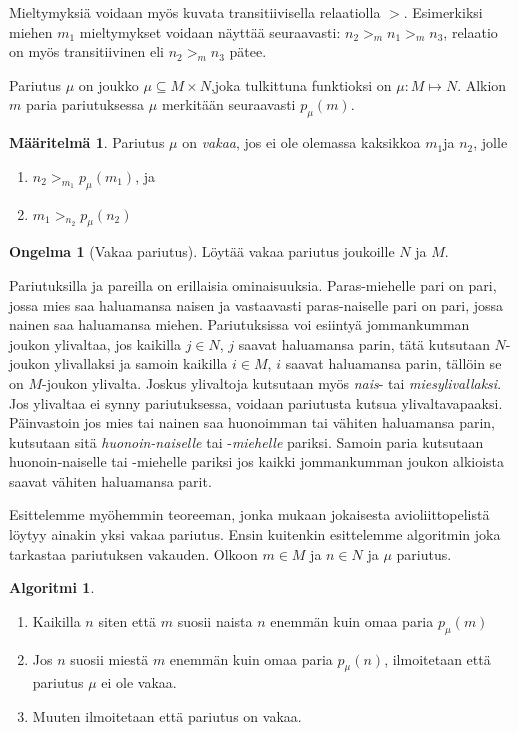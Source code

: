 \documentclass[finnish]{tktltiki2}
\theoremstyle{definition}
\newtheorem{maar}[lau]{Määritelmä}
\newtheorem{ong}{Ongelma}
\newtheorem{alg}[lau]{Algoritmi}
\theoremstyle{remark}
\begin{document}
Mieltymyksiä voidaan myös kuvata transitiivisella relaatiolla $>$. Esimerkiksi miehen $m_1$ mieltymykset voidaan näyttää seuraavasti: $n_2 >_{m} n_1 >_{m} n_3$, relaatio on myös transitiivinen eli $n_2 >_{m} n_3$ pätee.

Pariutus $\mu$ on joukko $\mu \subseteq M \times N$,joka tulkittuna funktioksi on  $\mu : M \mapsto N$. Alkion $m$ paria pariutuksessa $\mu$ merkitään seuraavasti $p_{\mu}(m)$.

\begin{maar}
Pariutus $\mu$ on \emph{vakaa}, jos ei ole olemassa kaksikkoa $m_1$ja  $n_2$, jolle
\begin{enumerate}
	\item $n_2 >_{m_{1}} p_{\mu}(m_1)$, ja
	\item $m_1 >_{n_{2}} p_{\mu}(n_2)$
\end{enumerate}
\begin{ong}[Vakaa pariutus]
Löytää  vakaa pariutus joukoille $N$ ja $M$.
\end{ong}

\end{maar}
Pariutuksilla ja pareilla on erillaisia ominaisuuksia. Paras-miehelle pari on pari, jossa mies saa haluamansa naisen ja vastaavasti paras-naiselle pari on pari, jossa nainen saa haluamansa miehen. Pariutuksissa voi esiintyä jommankumman joukon ylivaltaa, jos kaikilla $j \in N$, $j$ saavat haluamansa parin, tätä kutsutaan $N$-joukon ylivallaksi ja samoin kaikilla $i \in M$, $i$ saavat haluamansa parin, tällöin se on $M$-joukon ylivalta. Joskus ylivaltoja kutsutaan myös \emph{nais}- tai \emph{miesylivallaksi}. Jos ylivaltaa ei synny pariutuksessa, voidaan pariutusta kutsua ylivaltavapaaksi.
Päinvastoin jos mies tai nainen saa huonoimman tai vähiten haluamansa parin, kutsutaan sitä \emph{huonoin-naiselle} tai -\emph{miehelle} pariksi. Samoin paria kutsutaan huonoin-naiselle tai -miehelle pariksi jos kaikki jommankumman joukon alkioista saavat vähiten haluamansa parit.

Esittelemme myöhemmin teoreeman, jonka mukaan jokaisesta avioliittopelistä löytyy ainakin yksi vakaa pariutus. Ensin kuitenkin esittelemme algoritmin joka tarkastaa pariutuksen vakauden.
Olkoon $m \in M$ ja $n \in N$ ja $\mu$ pariutus.
\begin{alg}
\begin{enumerate}
	\item Kaikilla $n$ siten että $m$ suosii naista $n$ enemmän kuin omaa paria $p_{\mu}(m)$
	\item Jos $n$ suosii miestä $m$ enemmän kuin omaa paria $p_{\mu}(n)$, ilmoitetaan että pariutus $\mu$ ei ole vakaa.
	\item Muuten ilmoitetaan että pariutus on vakaa.
\end{enumerate}
\end{alg}
\end{document}
